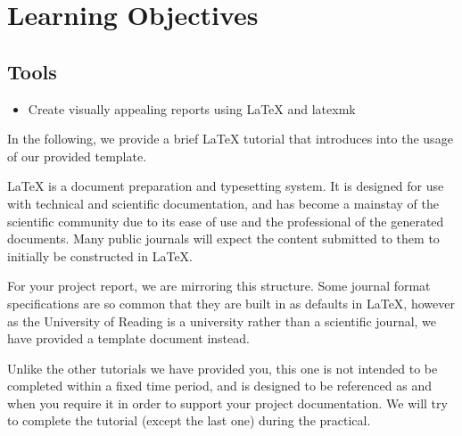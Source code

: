 


\author{Lucille L. Blumire, Julian Kunkel}
\date{Week 8}

\makesheetheader

\section*{Learning Objectives}

\subsection*{Tools}

\begin{itemize}
  \item Create visually appealing reports using \LaTeX{} and latexmk
\end{itemize}

\tableofcontents


In the following, we provide a brief \LaTeX{} tutorial that introduces into the usage of our provided template.

\LaTeX{} is a document preparation and typesetting system.
It is designed for use with technical and scientific documentation, and has become a mainstay of the scientific community due to its ease of use and the professional of the generated documents.
Many public journals will expect the content submitted to them to initially be constructed in \LaTeX{}.

For your project report, we are mirroring this structure. Some journal format specifications are so common that they are built in as defaults in \LaTeX{}, however as the University of Reading is a university rather than a scientific journal, we have provided a template document instead.

Unlike the other tutorials we have provided you, this one is not intended to be completed within a fixed time period, and is designed to be referenced as and when you require it in order to support your project documentation.
We will try to complete the tutorial (except the last one) during the practical.


